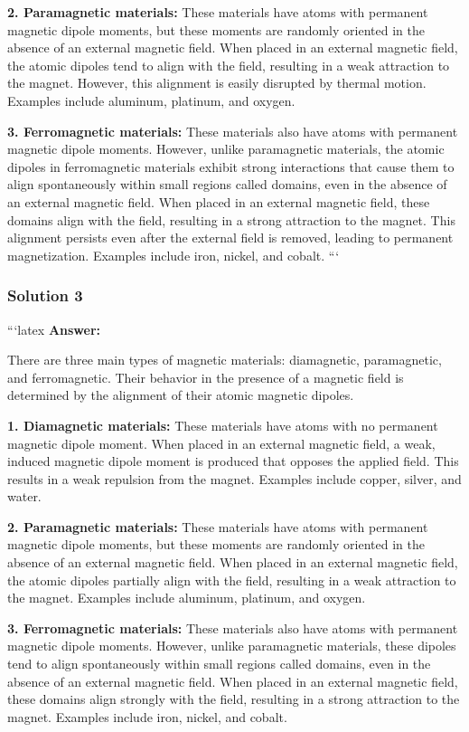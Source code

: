 \documentclass{article}
\begin{document}
\textbf{2. Paramagnetic materials:} 
These materials have atoms with permanent magnetic dipole moments, but these moments are randomly oriented in the absence of an external magnetic field. When placed in an external magnetic field, the atomic dipoles tend to align with the field, resulting in a weak attraction to the magnet. However, this alignment is easily disrupted by thermal motion. Examples include aluminum, platinum, and oxygen.

\textbf{3. Ferromagnetic materials:}
These materials also have atoms with permanent magnetic dipole moments. However, unlike paramagnetic materials, the atomic dipoles in ferromagnetic materials exhibit strong interactions that cause them to align spontaneously within small regions called domains, even in the absence of an external magnetic field. When placed in an external magnetic field, these domains align with the field, resulting in a strong attraction to the magnet. This alignment persists even after the external field is removed, leading to permanent magnetization. Examples include iron, nickel, and cobalt. 
```

\subsubsection{Solution 3}
```latex
\textbf{Answer:}

There are three main types of magnetic materials: diamagnetic, paramagnetic, and ferromagnetic. Their behavior in the presence of a magnetic field is determined by the alignment of their atomic magnetic dipoles.

\textbf{1. Diamagnetic materials:} 
These materials have atoms with no permanent magnetic dipole moment. When placed in an external magnetic field, a weak, induced magnetic dipole moment is produced that opposes the applied field. This results in a weak repulsion from the magnet. Examples include copper, silver, and water.

\textbf{2. Paramagnetic materials:}
These materials have atoms with permanent magnetic dipole moments, but these moments are randomly oriented in the absence of an external magnetic field. When placed in an external magnetic field, the atomic dipoles partially align with the field, resulting in a weak attraction to the magnet.  Examples include aluminum, platinum, and oxygen.

\textbf{3. Ferromagnetic materials:}
These materials also have atoms with permanent magnetic dipole moments. However, unlike paramagnetic materials, these dipoles tend to align spontaneously within small regions called domains, even in the absence of an external magnetic field. When placed in an external magnetic field, these domains align strongly with the field, resulting in a strong attraction to the magnet. Examples include iron, nickel, and cobalt.
\end{document}
